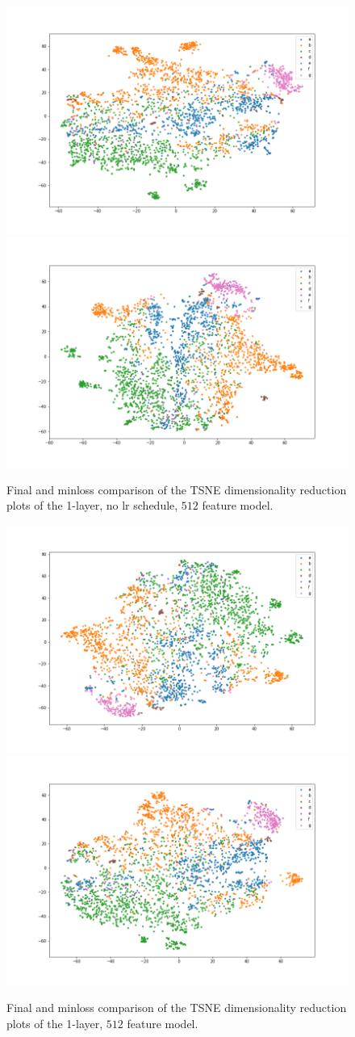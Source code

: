 \begin{figure}[!ht]
  \includegraphics[width=0.49\linewidth]{latex/imgs/tsne_1_layer_no_schedule_512_final.png}
  \includegraphics[width=0.49\linewidth]{latex/imgs/tsne_1_layer_no_schedule_512_minloss.png}
  \caption{Final and minloss comparison of the TSNE dimensionality reduction plots of the 1-layer, no lr schedule, $512$ feature model.}
\end{figure}
\begin{figure}[!ht]
  \includegraphics[width=0.49\linewidth]{latex/imgs/tsne_1_layer_with_schedule_512_final.png}
  \includegraphics[width=0.49\linewidth]{latex/imgs/tsne_1_layer_with_schedule_512_minloss.png}
  \caption{Final and minloss comparison of the TSNE dimensionality reduction plots of the 1-layer, $512$ feature model.}
\end{figure}
